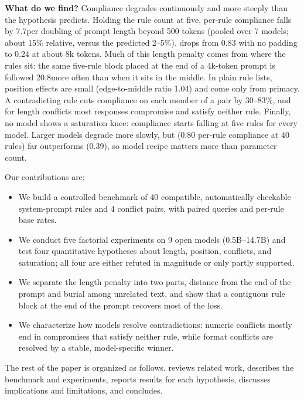 {\bf What do we find?}
Compliance degrades continuously and more steeply than the hypothesis predicts.
Holding the rule count at five, per-rule compliance falls by 7.7\pp per doubling of prompt length beyond 500 tokens (pooled over 7 models; about 15\% relative, versus the predicted 2--5\%).
\qseven drops from 0.83 with no padding to 0.24 at about 8k tokens.
Much of this length penalty comes from where the rules sit: the same five-rule block placed at the end of a 4k-token prompt is followed 20.8\pp more often than when it sits in the middle.
In plain rule lists, position effects are small (edge-to-middle ratio 1.04) and come only from primacy.
A contradicting rule cuts compliance on each member of a pair by 30--83\%, and for length conflicts most responses compromise and satisfy neither rule.
Finally, no model shows a saturation knee: compliance starts falling at five rules for every model.
Larger models degrade more slowly, but \qwenthree (0.80 per-rule compliance at 40 rules) far outperforms \qfourteen (0.39), so model recipe matters more than parameter count.

Our contributions are:
\begin{itemize}[leftmargin=*,itemsep=0pt,topsep=0pt]
    \item We build a controlled benchmark of 40 compatible, automatically checkable system-prompt rules and 4 conflict pairs, with paired queries and per-rule base rates.
    \item We conduct five factorial experiments on 9 open models (0.5B--14.7B) and test four quantitative hypotheses about length, position, conflicts, and saturation; all four are either refuted in magnitude or only partly supported.
    \item We separate the length penalty into two parts, distance from the end of the prompt and burial among unrelated text, and show that a contiguous rule block at the end of the prompt recovers most of the loss.
    \item We characterize how models resolve contradictions: numeric conflicts mostly end in compromises that satisfy neither rule, while format conflicts are resolved by a stable, model-specific winner.
\end{itemize}

The rest of the paper is organized as follows.
 reviews related work,  describes the benchmark and experiments,  reports results for each hypothesis,  discusses implications and limitations, and  concludes.
